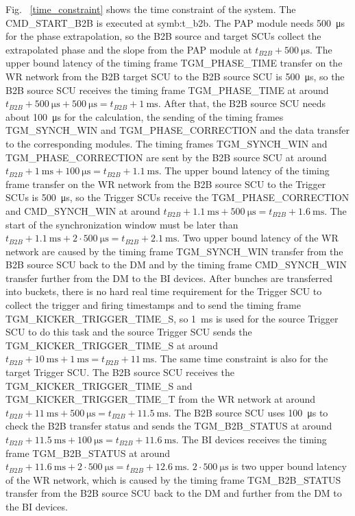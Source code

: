 Fig. ~\ref{time_constraint} shows the time constraint of the system. The CMD\_START\_B2B is executed at \gls{symb:t_b2b}. The PAP module needs \SI{500}{\us} for the phase extrapolation, so the B2B source and target SCUs collect the extrapolated phase and the slope from the PAP module at $t_\mathit{B2B} + \SI{500}{\us}$. The upper bound latency of the timing frame TGM\_PHASE\_TIME transfer on the WR network from the B2B target SCU to the B2B source SCU is \SI{500}{\us}, so the B2B source SCU receives the timing frame TGM\_PHASE\_TIME at around $t_\mathit{B2B} + \SI{500}{\us} + \SI{500}{\us} = t_\mathit{B2B} + \SI{1}{\ms}$. After that, the B2B source SCU needs about \SI{100}{\us} for the calculation, the sending of the timing frames TGM\_SYNCH\_WIN and TGM\_PHASE\_CORRECTION and the data transfer to the corresponding modules. The timing frames TGM\_SYNCH\_WIN and TGM\_PHASE\_CORRECTION are sent by the B2B source SCU at around $t_\mathit{B2B} + \SI{1}{\ms} + \SI{100}{\us} = t_\mathit{B2B} + \SI{1.1}{\ms}$. The upper bound latency of the timing frame transfer on the WR network from the B2B source SCU to the Trigger SCUs is \SI{500}{\us}, so the Trigger SCUs receive the TGM\_PHASE\_CORRECTION and CMD\_SYNCH\_WIN at around $t_\mathit{B2B} + \SI{1.1}{\ms} + \SI{500}{\us} = t_\mathit{B2B} + \SI{1.6}{\ms}$. The start of the synchronization window must be later than $t_\mathit{B2B} + \SI{1.1}{\ms} + 2\cdot\SI{500}{\us} = t_\mathit{B2B} + \SI{2.1}{\ms}$. Two upper bound latency of the WR network are caused by the timing frame TGM\_SYNCH\_WIN transfer from the B2B source SCU back to the DM and by the timing frame CMD\_SYNCH\_WIN transfer further from the DM to the BI devices. After bunches are transferred into buckets, there is no hard real time requirement for the Trigger SCU to collect the trigger and firing timestamps and to send the timing frame TGM\_KICKER\_TRIGGER\_TIME\_S, so \SI{1}{\ms} is used for the source Trigger SCU to do this task and the source Trigger SCU sends the TGM\_KICKER\_TRIGGER\_TIME\_S at around $t_\mathit{B2B} + \SI{10}{\ms} + \SI{1}{\ms} = t_\mathit{B2B} + \SI{11}{\ms}$. The same time constraint is also for the target Trigger SCU. The B2B source SCU receives the TGM\_KICKER\_TRIGGER\_TIME\_S and TGM\_KICKER\_TRIGGER\_TIME\_T from the WR network at around $t_\mathit{B2B} + \SI{11}{\ms} + \SI{500}{\us} = t_\mathit{B2B} + \SI{11.5}{\ms}$. The B2B source SCU uses \SI{100}{\us} to check the B2B transfer status and sends the TGM\_B2B\_STATUS at around $t_\mathit{B2B} + \SI{11.5}{\ms} + \SI{100}{\us} = t_\mathit{B2B} + \SI{11.6}{\ms}$. The BI devices receives the timing frame TGM\_B2B\_STATUS at around $t_\mathit{B2B} + \SI{11.6}{\ms} + 2\cdot\SI{500}{\us} = t_\mathit{B2B} + \SI{12.6}{\ms}$. $2\cdot\SI{500}{\us}$ is two upper bound latency of the WR network, which is caused by the timing frame TGM\_B2B\_STATUS transfer from the B2B source SCU back to the DM and further from the DM to the BI devices.

